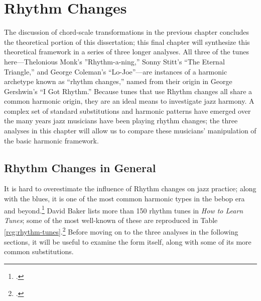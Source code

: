 
\chapter{Rhythm Changes}
\label{chap:rhythm-changes}
\addtocspace

The discussion of chord-scale transformations in the previous chapter
concludes the theoretical portion of this dissertation; this final chapter
will synthesize this theoretical framework in a series of three longer
analyses. All three of the tunes here---Thelonious Monk's ''Rhythm-a-ning,''
Sonny Stitt's ``The Eternal Triangle,'' and George Coleman's ``Lo-Joe''---are
instances of a harmonic archetype known as ``rhythm changes,'' named from
their origin in George Gershwin's ``I Got Rhythm.'' Because tunes
that use Rhythm changes all share a common harmonic origin, they are an ideal
means to investigate jazz harmony. A complex set of standard substitutions and
harmonic patterns have emerged over the many years jazz musicians have been
playing rhythm changes; the three analyses in this chapter will allow us to
compare these musicians' manipulation of the basic harmonic framework.

\section{Rhythm Changes in General}
\label{sec:rhythm-changes-general}

It is hard to overestimate the influence of Rhythm changes on jazz practice;
along with the blues, it is one of the most common harmonic types in the bebop
era and beyond.\footcite[13]{owens:1995} David Baker lists more than 150
rhythm tunes in \emph{How to Learn Tunes}; some of the most well-known
of these are reproduced in Table
\ref{rcg:rhythm-tunes}.\footcite[42--44]{baker:tunes} Before moving on to the
three analyses in the following sections, it will be useful to examine the
form itself, along with some of its more common substitutions.

